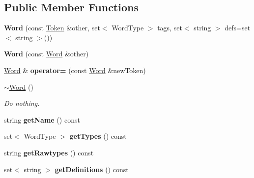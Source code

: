 \subsection*{Public Member Functions}
\begin{DoxyCompactItemize}
\item 
\hypertarget{classNLP_1_1Word_ab3c1ee97a462ae81d2beb6036b0e6464}{{\bfseries Word} (const \hyperlink{classToken}{Token} \&other, set$<$ Word\-Type $>$ tags, set$<$ string $>$ defs=set$<$ string $>$())}\label{classNLP_1_1Word_ab3c1ee97a462ae81d2beb6036b0e6464}

\item 
\hypertarget{classNLP_1_1Word_a1d3d8d0a6a2483459a343c6826bd9a1d}{{\bfseries Word} (const \hyperlink{classNLP_1_1Word}{Word} \&other)}\label{classNLP_1_1Word_a1d3d8d0a6a2483459a343c6826bd9a1d}

\item 
\hypertarget{classNLP_1_1Word_a031a3d38663f2475cb1a2cdd8f913a5f}{\hyperlink{classNLP_1_1Word}{Word} \& {\bfseries operator=} (const \hyperlink{classNLP_1_1Word}{Word} \&new\-Token)}\label{classNLP_1_1Word_a031a3d38663f2475cb1a2cdd8f913a5f}

\item 
\hypertarget{classNLP_1_1Word_ae0532af7d6dd1af235d9905fb05180ef}{\hyperlink{classNLP_1_1Word_ae0532af7d6dd1af235d9905fb05180ef}{$\sim$\-Word} ()}\label{classNLP_1_1Word_ae0532af7d6dd1af235d9905fb05180ef}

\begin{DoxyCompactList}\small\item\em Do nothing. \end{DoxyCompactList}\item 
\hypertarget{classNLP_1_1Word_a8b9f67069d067c9f1f95a7db47f34fca}{string {\bfseries get\-Name} () const }\label{classNLP_1_1Word_a8b9f67069d067c9f1f95a7db47f34fca}

\item 
\hypertarget{classNLP_1_1Word_a5249b40d5a2c47b358ba62eb50fc9487}{set$<$ Word\-Type $>$ {\bfseries get\-Types} () const }\label{classNLP_1_1Word_a5249b40d5a2c47b358ba62eb50fc9487}

\item 
\hypertarget{classNLP_1_1Word_a08390797ca3573623becf73a8ac97dba}{string {\bfseries get\-Rawtypes} () const }\label{classNLP_1_1Word_a08390797ca3573623becf73a8ac97dba}

\item 
\hypertarget{classNLP_1_1Word_a2e5b2960a52245f6581183d02e823cf8}{set$<$ string $>$ {\bfseries get\-Definitions} () const }\label{classNLP_1_1Word_a2e5b2960a52245f6581183d02e823cf8}

\end{DoxyCompactItemize}
